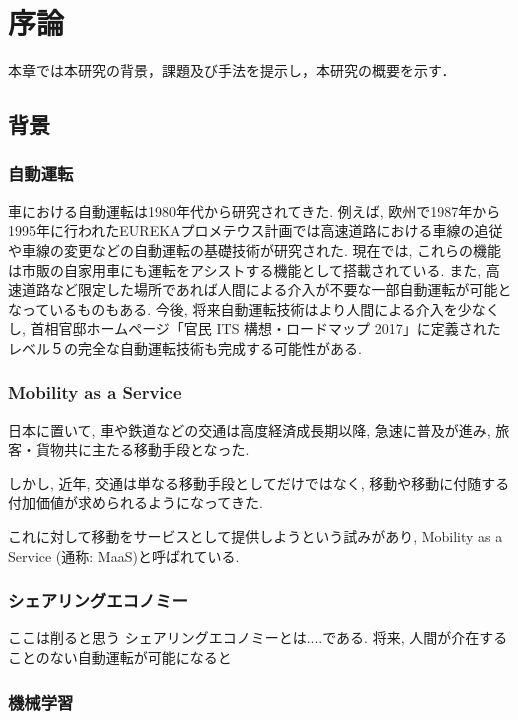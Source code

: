 \chapter{序論}
\label{introduction}

本章では本研究の背景，課題及び手法を提示し，本研究の概要を示す．


\section{背景}
\label{introduction:background}





\subsection{自動運転}

車における自動運転は1980年代から研究されてきた.
例えば, 欧州で1987年から1995年に行われたEUREKAプロメテウス計画では高速道路における車線の追従や車線の変更などの自動運転の基礎技術が研究された.
現在では, これらの機能は市販の自家用車にも運転をアシストする機能として搭載されている. また, 高速道路など限定した場所であれば人間による介入が不要な一部自動運転が可能となっているものもある.
今後, 将来自動運転技術はより人間による介入を少なくし, 首相官邸ホームページ「官民 ITS 構想・ロードマップ 2017」に定義されたレベル５の完全な自動運転技術も完成する可能性がある.


\subsection{Mobility as a Service}

日本に置いて, 車や鉄道などの交通は高度経済成長期以降, 急速に普及が進み, 旅客・貨物共に主たる移動手段となった. 

しかし, 近年, 交通は単なる移動手段としてだけではなく, 移動や移動に付随する付加価値が求められるようになってきた.

これに対して移動をサービスとして提供しようという試みがあり, Mobility as a Service (通称: MaaS)と呼ばれている.

\subsection{シェアリングエコノミー}

ここは削ると思う
シェアリングエコノミーとは....である. 将来, 人間が介在することのない自動運転が可能になると

\subsection{機械学習}

